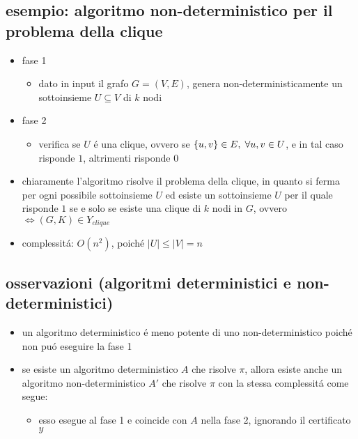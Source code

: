 \subsection*{esempio: algoritmo non-deterministico per il problema della clique}
\begin{flushleft}
	\begin{itemize}
		\item fase 1
		\begin{itemize}
			\item dato in input il grafo $G=(V,E)$, genera non-deterministicamente un sottoinsieme $U\subseteq V$ di $k$ nodi
		\end{itemize}
		\item fase 2
		\begin{itemize}
			\item verifica se $U$ \'e una clique, ovvero se $\{u,v\}\in E,\hspace{0.1cm}\forall u,v\in U$, e in tal caso risponde $1$, altrimenti risponde $0$
		\end{itemize}
	\item chiaramente l'algoritmo risolve il problema della clique, in quanto si ferma per ogni possibile sottoinsieme $U$ ed esiste un sottoinsieme $U$ per il quale risponde $1$ se e solo se esiste una clique di $k$ nodi in $G$, ovvero $\iff(G,K)\in Y_{clique}$
	\item complessit\'a: $O(n^2)$, poich\'e $|U|\leq|V|=n$
	\end{itemize}
\end{flushleft}


\subsection*{osservazioni (algoritmi deterministici e non-deterministici)}
\begin{flushleft}
	\begin{itemize}
		\item un algoritmo deterministico \'e meno potente di uno non-deterministico poich\'e non pu\'o eseguire la fase 1
		\item se esiste un algoritmo deterministico $A$ che risolve $\pi$, allora esiste anche un algoritmo non-deterministico $A'$ che risolve $\pi$ con la stessa complessit\'a come segue:
			\begin{itemize}
				\item esso esegue al fase 1 e coincide con $A$ nella fase 2, ignorando il certificato $y$
			\end{itemize}
	\end{itemize}
\end{flushleft}

